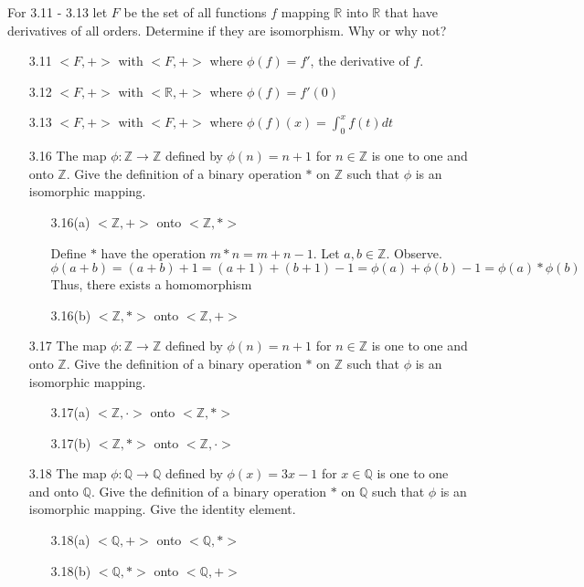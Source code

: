 \documentclass[12pt]{article}
\newcommand{\Z}{\mathds{Z}}
\newcommand{\R}{\mathbb{R}}
\newcommand{\Q}{\mathbb{Q}}
\begin{document}
\begin{enumerate}
\begin{enumerate}
		\end{enumerate}
		
		For 3.11 - 3.13 let $F$ be the set of all functions $f$ mapping $\R$ into $\R$ that have derivatives of all orders. Determine if they are isomorphism. Why or why not?
		
		\begin{enumerate}
			
			\item[3.11] $<F,+>$ with $<F,+>$ where $\phi(f) = f'$, the derivative of $f$.
			
			\item[3.12] $<F,+>$ with $<\R,+>$ where $\phi(f) = f'(0)$
			
			\item[3.13] $<F,+>$ with $<F,+>$ where $\phi(f)(x) = \int_0^xf(t)dt $ 
			
			\item[3.16] The map $\phi: \Z \rightarrow \Z$ defined by $\phi (n) = n+1$ for $n \in \Z$ is one to one and onto $\Z$. Give the definition of a binary operation $*$ on $\Z$ such that $\phi$ is an isomorphic mapping.
			\begin{enumerate}
				\item[3.16(a)]
				$<\Z,+>$ onto $<\Z,\ast>$
				
				Define $\ast$ have the operation $m\ast n = m + n - 1$. Let $a,b \in \Z$. Observe. 
				\[\phi(a+b) = (a+b) + 1 = (a + 1) + (b + 1) - 1 = \phi(a) + \phi(b) - 1 = \phi(a)\ast \phi(b)\]
				Thus, there exists a homomorphism 
				\item[3.16(b)]
				$<\Z,\ast>$ onto $<\Z,+>$
				
			\end{enumerate}
			
			\item[3.17] The map $\phi: \Z \rightarrow \Z$ defined by $\phi(n)=n+1$ for $n \in \Z$ is one to one and onto $\Z$. Give the definition of a binary operation $\ast$ on $\Z$ such that $\phi$ is an isomorphic mapping.
			\begin{enumerate}
				\item[3.17(a)]
				$<\Z,\cdot>$ onto $<\Z,\ast>$
				\item[3.17(b)]
				$<\Z,\ast>$ onto $<\Z,\cdot>$
			\end{enumerate}
			
			\item[3.18] The map $\phi: \Q \rightarrow \Q$ defined by $\phi(x)=3x-1$ for $x \in \Q$ is one to one and onto $\Q$. Give the definition of a binary operation $\ast$ on $\Q$ such that $\phi$ is an isomorphic mapping. Give the identity element.
			\begin{enumerate}
				\item[3.18(a)]
				$<\Q,+>$ onto $<\Q,\ast>$
				\item[3.18(b)]
				$<\Q,\ast>$ onto $<\Q,+>$
				

\end{enumerate}
\end{enumerate}
\end{enumerate}
\end{document}
